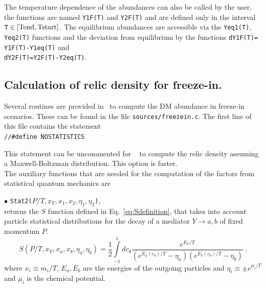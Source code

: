 \documentclass[12pt,a4paper]{article}
\begin{document}
The  temperature dependence  of the abundances can also be called by the user, the functions are named {\tt Y1F(T)} and {\tt Y2F(T)} and are defined only in the  interval ${\tt T}\in
[\rm{Tend},\rm{Tstart}]$. The equilibrium abundances are accessible via  the  { \tt Yeq1(T)}, { \tt Yeq2(T)} functions and the deviation from equilibrium  
by the functions
 {\tt dY1F(T)= Y1F(T)-Y1eq(T)}  and \\
   { \tt dY2F(T)=Y2F(T)-Y2eq(T)}.

\subsection{Calculation of relic density for freeze-in.}
\label{sec:routines} 

Several routines are provided in \micro~to compute the DM abundance in freeze-in scenarios. These can be found in the file \verb|sources/freezein.c|. The first line of this file contains the statement \\
\verb|//#define NOSTATISTICS|

\noindent
This statement can be uncommented for \micro~ to compute the relic density assuming a Maxwell-Boltzman distribution. This option is faster. 
\\
The auxiliary functions that are needed for the computation of the factors from statistical quantum mechanics are 

\noindent
$\bullet$ \verb|Stat2(|$P/T,x_Y,x_1,x_2,\eta_1,\eta_2$\verb|)|,\\
 returns the $S$ function defined in Eq.~\eqref{eq:Sdefinition}, that takes into account particle statistical distributions for the decay of a mediator $Y \rightarrow a,b$ of fixed momentum $P$. 
\begin{equation}\label{eq:Sdefinition}
S\left( P/T, x_Y, x_a, x_b, \eta_a, \eta_b \right)= \frac{1}{2}\int\limits_{-1}^{1} dc_{\theta}
\frac{e^{E_Y/T}}{(e^{E_a(c_\theta)/T} - \eta_a)(e^{E_b(c_\theta)/T} - \eta_b)}\ .
\end{equation}
where $x_i \equiv m_i/T$, $E_a,E_b$ are the energies of the outgoing particles and $\eta_i \equiv \pm e^{\mu_i/T}$ and $\mu_i$ is the chemical potential.\\
\end{document}
